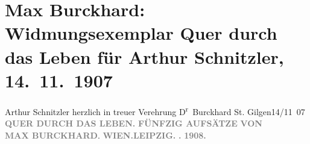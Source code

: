 

         \renewcommand{\erwaehnteInstitutionen}{Institutionen: F. Tempsky, G. Freytag}
         \renewcommand{\erwaehnteOrte}{Orte: Leipzig, St. Gilgen, Wien}
         \renewcommand{\erwaehnteWerke}{Werke: Quer durch das Leben. Fünfzig Aufsätze}
               \section[Max Burckhard: Widmungsexemplar Quer durch das Leben für Arthur Schnitzler, 14. 11. 1907]{ Max Burckhard: Widmungsexemplar Quer durch das Leben für Arthur Schnitzler,
                    14. 11. 1907}\nopagebreak{}\rehead{ }\begin{ledgroupsized}[t]{13cm}\normalsize\beginnumbering \toendnotes[C]{\smallbreak\pagebreak[2]} 
\pstart
           \noindent{}{\pb}Arthur Schnitzler herzlich in treuer
                    Verehrung\pend
           \pstart \spacefill\mbox{D\textsuperscript{r} Burckhard}\pend{}\pstart
           St. Gilgen14/11 07\pend
           {\bigskip}\pstart
           \noindent{}\centering{}\textcolor{gray}{\textbf{QUER DURCH DAS LEBEN.}}\pend
           \pstart
           \noindent{}\centering{}\textcolor{gray}{\textbf{FÜNFZIG
                    AUFSÄTZE}}\pend
           \pstart
           \noindent{}\centering{}\textcolor{gray}{\textbf{VON}}{\\}\textcolor{gray}{\textbf{MAX BURCKHARD}}.\pend
           {\bigskip}\pstart
           \noindent{}\textcolor{gray}{\textbf{WIEN.}}\hfill \textcolor{gray}{\textbf{LEIPZIG.}}\pend
           \pstart
           \textcolor{gray}{\textbf{.}}\hfill \textcolor{gray}{\textbf{}}\pend
           \pstart
           \centering{}\textcolor{gray}{\textbf{1908.}}\pend
           
         
         \endnumbering{}\end{ledgroupsized}  \newcommand{\dateiname}{L01730}\newcommand{\titel}{Max Burckhard: Widmungsexemplar Quer durch das Leben für Arthur Schnitzler, 14. 11. 1907}\newcommand{\editorInnen}{Martin Anton Müller und Gerd-Hermann Susen}
      